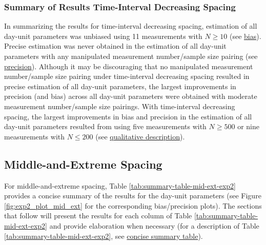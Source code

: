 \documentclass[
12pt, %
twoside,
english]{guelphthesis}
\begin{document}
\hypertarget{summary-of-results-time-interval-decreasing-spacing-1}{%
\subsubsection{Summary of Results Time-Interval Decreasing Spacing}\label{summary-of-results-time-interval-decreasing-spacing-1}}

In summarizing the results for time-interval decreasing spacing, estimation of all day-unit parameters was unbiased using 11 measurements with \(N \ge 10\) (see \protect\hyperlink{bias-time-dec-exp2}{bias}). Precise estimation was never obtained in the estimation of all day-unit parameters with any manipulated measurement number/sample size pairing (see \protect\hyperlink{precision-time-inc-exp2}{precision}). Although it may be discouraging that no manipulated measurement number/sample size pairing under time-interval decreasing spacing resulted in precise estimation of all day-unit parameters, the largest improvements in precision (and bias) across all day-unit parameters were obtained with moderate measurement number/sample size pairings. With time-interval decreasing spacing, the largest improvements in bias and precision in the estimation of all day-unit parameters resulted from using five measurements with \(N \ge 500\) or nine measurements with \(N \le 200\) (see \protect\hyperlink{qualitative-time-inc-exp2}{qualitative description}).

\hypertarget{middle-and-extreme-spacing-1}{%
\subsection{Middle-and-Extreme Spacing}\label{middle-and-extreme-spacing-1}}

For middle-and-extreme spacing, Table \ref{tab:summary-table-mid-ext-exp2} provides a concise summary of the results for the day-unit parameters (see Figure \ref{fig:exp2_plot_mid_ext} for the corresponding bias/precision plots). The sections that follow will present the results for each column of Table \ref{tab:summary-table-mid-ext-exp2} and provide elaboration when necessary (for a description of Table \ref{tab:summary-table-mid-ext-exp2}, see \protect\hyperlink{concise-example}{concise summary table}).
\end{document}
